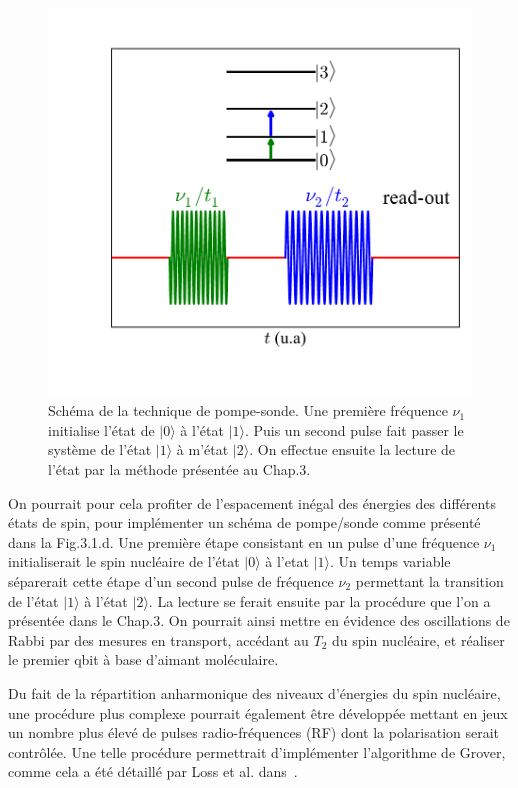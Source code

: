 \begin{figure}[h!]
\parbox{7cm}{
\includegraphics[scale=0.45]{Conclusion/spin_nuc_man/spin_nuc_man.pdf} 
}
\parbox{6.5cm}{\caption{Schéma de la technique de pompe-sonde. Une première fréquence $\nu_1$ initialise l'état de $|0\rangle$ à l'état $|1\rangle$. Puis un second pulse fait passer le système de l'état $|1\rangle$ à m'état $|2\rangle$. On effectue ensuite la lecture de l'état par la méthode présentée au Chap.3.}
\label{spin_nuc_man}
}
\end{figure}

On pourrait pour cela profiter de l'espacement inégal des énergies des différents états de spin, pour implémenter un schéma de pompe/sonde comme présenté dans la Fig.3.1.d. Une première étape consistant en un pulse d'une fréquence $\nu_1$ initialiserait le spin nucléaire de l’état $|0\rangle$ à l'etat $|1\rangle$. Un temps variable séparerait cette étape d'un second pulse de fréquence $\nu_2$ permettant la transition de l’état $|1\rangle$ à l’état $|2\rangle$. La lecture se ferait ensuite par la procédure que l'on a présentée dans le Chap.3. On pourrait ainsi mettre en évidence des oscillations de Rabbi par des mesures en transport, accédant au $T_2$ du spin nucléaire, et réaliser le premier qbit à base d'aimant moléculaire.

Du fait de la répartition anharmonique des niveaux d’énergies du spin nucléaire, une procédure plus complexe pourrait également être développée mettant en jeux un nombre plus élevé de pulses radio-fréquences (RF) dont la polarisation serait contrôlée. Une telle procédure permettrait d’implémenter l'algorithme de Grover, comme cela a été détaillé par Loss et al. dans~\cite{Leuenberger2003}.

